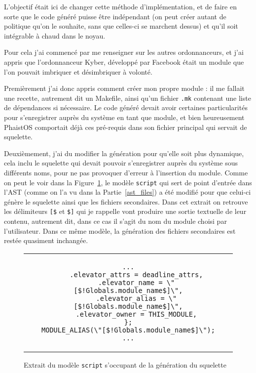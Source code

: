 L'objectif était ici de changer cette méthode d'implémentation, et de faire en 
sorte que le code généré puisse être indépendant (on peut créer autant de 
politique qu'on le souhaite, sans que celles-ci se marchent dessus) et qu'il 
soit intégrable à chaud dans le noyau.

Pour cela j'ai commencé par me renseigner sur les autres ordonnanceurs, et j'ai 
appris que l'ordonnanceur Kyber, développé par Facebook était un module que 
l'on pouvait imbriquer et désimbriquer à volonté. 

Premièrement j'ai donc appris comment créer mon propre module : il me fallait 
une recette, autrement dit un Makefile, ainsi qu'un fichier \texttt{.mk} 
contenant une liste de dépendances si nécessaire. Le code généré devait avoir 
certaines particularités pour s'enregistrer auprès du système en tant que 
module, et bien heureusement PhaistOS comportait déjà ces pré-requis dans son 
fichier principal qui servait de squelette.

Deuxièmement, j'ai du modifier la génération pour qu'elle soit plus dynamique, 
cela inclu le squelette qui devait pouvoir s'enregistrer auprès du système sous 
différents noms, pour ne pas provoquer d'erreur à l'insertion du module. Comme 
on peut le voir dans la Figure~\ref{fig:module_name_c}, le modèle \texttt
{script} qui sert de point d'entrée dans l'AST (comme on l'a vu dans la 
Partie~\ref{ast_files}) a été modifié pour que celui-ci génère le squelette 
ainsi que les fichiers secondaires. Dans cet extrait on retrouve les 
délimiteurs \texttt{[\$} et \texttt{\$]} qui je rappelle vont produire une 
sortie textuelle de leur contenu, autrement dit, dans ce cas il s'agit du nom 
du module choisi par l'utilisateur. Dans ce même modèle, la génération des 
fichiers secondaires est restée quasiment inchangée.

\begin{figure}[h!t] \centering
    \begin{tabular}{c}
        \begin{lstlisting}[language=Phaistos-Template, linewidth=11.5cm]
    ...
    .elevator_attrs = deadline_attrs,
    .elevator_name = \"[$!Globals.module_name$]\",
    .elevator_alias = \"[$!Globals.module_name$]\",
    .elevator_owner = THIS_MODULE,
};
MODULE_ALIAS(\"[$!Globals.module_name$]\");
...
        \end{lstlisting}
    \end{tabular}
    \caption{Extrait du modèle \texttt{script} s'occupant de la génération du 
    squelette}
    \label{fig:module_name_c}
\end{figure}

